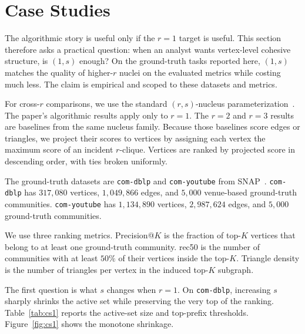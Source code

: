 \section{Case Studies}\label{sec:casestudy}

The algorithmic story is useful only if the \(r=1\) target is useful.
%
This section therefore asks a practical question:
when an analyst wants vertex-level cohesive structure, is \((1,s)\) enough?
%
On the ground-truth tasks reported here, \((1,s)\) matches the quality of higher-\(r\) nuclei on the evaluated metrics while costing much less.
%
The claim is empirical and scoped to these datasets and metrics.

\label{sec:cs-setup}
For cross-\(r\) comparisons, we use the standard \((r,s)\)-nucleus parameterization~\cite{nucleusSariyuce14}.
%
The paper's algorithmic results apply only to \(r=1\).
%
The \(r=2\) and \(r=3\) results are baselines from the same nucleus family.
%
Because those baselines score edges or triangles, we project their scores to vertices by assigning each vertex the maximum score of an incident \(r\)-clique.
%
Vertices are ranked by projected score in descending order, with ties broken uniformly.

The ground-truth datasets are \texttt{com-dblp} and \texttt{com-youtube} from SNAP~\cite{communityFinder}.
%
\texttt{com-dblp} has \(317{,}080\) vertices, \(1{,}049{,}866\) edges, and \(5{,}000\) venue-based ground-truth communities.
%
\texttt{com-youtube} has \(1{,}134{,}890\) vertices, \(2{,}987{,}624\) edges, and \(5{,}000\) ground-truth communities.

We use three ranking metrics.
%
Precision@\(K\) is the fraction of top-\(K\) vertices that belong to at least one ground-truth community.
%
rec50 is the number of communities with at least \(50\%\) of their vertices inside the top-\(K\).
%
Triangle density is the number of triangles per vertex in the induced top-\(K\) subgraph.

\label{sec:cs-granularity}
The first question is what \(s\) changes when \(r=1\).
%
On \texttt{com-dblp}, increasing \(s\) sharply shrinks the active set while preserving the very top of the ranking.
%
Table~\ref{tab:cs1} reports the active-set size and top-prefix thresholds.
%
Figure~\ref{fig:cs1} shows the monotone shrinkage.

